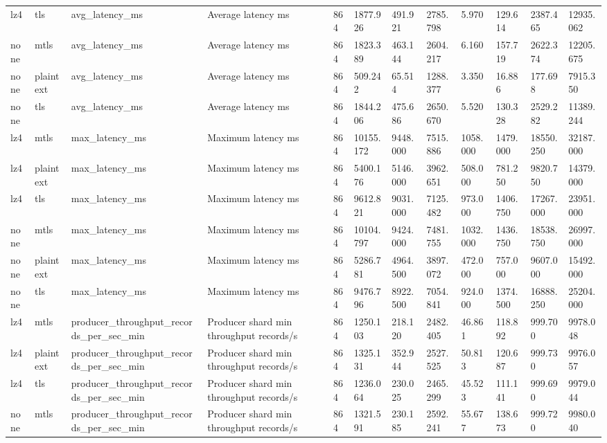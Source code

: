 \begin{longtable}{llllllllllll}
lz4 & tls & avg\_latency\_ms & Average latency ms & 864 & 1877.926 & 491.921 & 2785.798 & 5.970 & 129.614 & 2387.465 & 12935.062 \\
none & mtls & avg\_latency\_ms & Average latency ms & 864 & 1823.389 & 463.144 & 2604.217 & 6.160 & 157.719 & 2622.374 & 12205.675 \\
none & plaintext & avg\_latency\_ms & Average latency ms & 864 & 509.242 & 65.514 & 1288.377 & 3.350 & 16.886 & 177.698 & 7915.350 \\
none & tls & avg\_latency\_ms & Average latency ms & 864 & 1844.206 & 475.686 & 2650.670 & 5.520 & 130.328 & 2529.282 & 11389.244 \\
lz4 & mtls & max\_latency\_ms & Maximum latency ms & 864 & 10155.172 & 9448.000 & 7515.886 & 1058.000 & 1479.000 & 18550.250 & 32187.000 \\
lz4 & plaintext & max\_latency\_ms & Maximum latency ms & 864 & 5400.176 & 5146.000 & 3962.651 & 508.000 & 781.250 & 9820.750 & 14379.000 \\
lz4 & tls & max\_latency\_ms & Maximum latency ms & 864 & 9612.821 & 9031.000 & 7125.482 & 973.000 & 1406.750 & 17267.000 & 23951.000 \\
none & mtls & max\_latency\_ms & Maximum latency ms & 864 & 10104.797 & 9424.000 & 7481.755 & 1032.000 & 1436.750 & 18538.750 & 26997.000 \\
none & plaintext & max\_latency\_ms & Maximum latency ms & 864 & 5286.781 & 4964.500 & 3897.072 & 472.000 & 757.000 & 9607.000 & 15492.000 \\
none & tls & max\_latency\_ms & Maximum latency ms & 864 & 9476.796 & 8922.500 & 7054.841 & 924.000 & 1374.500 & 16888.250 & 25204.000 \\
lz4 & mtls & producer\_throughput\_records\_per\_sec\_min & Producer shard min throughput records/s & 864 & 1250.103 & 218.120 & 2482.405 & 46.861 & 118.892 & 999.700 & 9978.048 \\
lz4 & plaintext & producer\_throughput\_records\_per\_sec\_min & Producer shard min throughput records/s & 864 & 1325.131 & 352.944 & 2527.525 & 50.813 & 120.687 & 999.730 & 9976.057 \\
lz4 & tls & producer\_throughput\_records\_per\_sec\_min & Producer shard min throughput records/s & 864 & 1236.064 & 230.025 & 2465.299 & 45.523 & 111.141 & 999.690 & 9979.044 \\
none & mtls & producer\_throughput\_records\_per\_sec\_min & Producer shard min throughput records/s & 864 & 1321.591 & 230.185 & 2592.241 & 55.677 & 138.673 & 999.720 & 9980.040 \\

\end{longtable}
